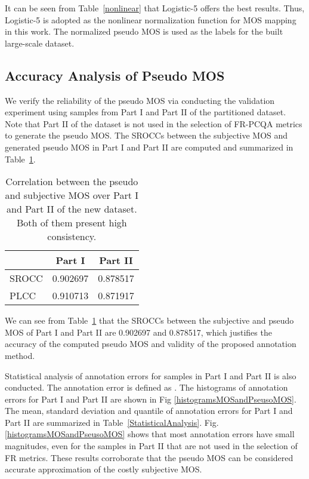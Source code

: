 \documentclass[acmsmall]{acmart}
\begin{document}
\par It can be seen from Table~\ref{nonlinear} that Logistic-5 offers the best results. Thus, Logistic-5 is adopted as the nonlinear normalization function for MOS mapping in this work. The normalized pseudo MOS is used as the labels for the built large-scale dataset.





\subsection{Accuracy Analysis of Pseudo MOS} \label{sec:accuracyverification}

\par We verify the reliability of the pseudo MOS via conducting the validation experiment using samples from Part I and Part II of the partitioned dataset. Note that Part II of the dataset is not used in the selection of FR-PCQA metrics to generate the pseudo MOS. The SROCCs between the subjective MOS and generated pseudo MOS in Part I and Part II are computed and summarized in Table~\ref{pseudoverification}.

\begin{table}[htbp]
  \centering
  \caption{Correlation between the pseudo and subjective MOS over Part I and Part II of the new dataset. Both of them present high consistency.}
  \begin{footnotesize}
    \begin{tabular}{l|cc}
    \hline
          & Part I & Part II \\
    \hline
    SROCC & 0.902697 & 0.878517 \\
    PLCC  & 0.910713 & 0.871917 \\
    \hline
    \end{tabular}\end{footnotesize}
  \label{pseudoverification}\end{table}

\par We can see from Table~\ref{pseudoverification} that the SROCCs between the subjective and pseudo MOS of Part I and Part II are 0.902697 and 0.878517, which justifies the accuracy of the computed pseudo MOS and validity of the proposed annotation method.

\par Statistical analysis of annotation errors for samples in Part I and Part II is also conducted. The annotation error is defined as . The histograms of annotation errors for Part I and Part II are shown in Fig \ref{histogramsMOSandPseusoMOS}. The mean, standard deviation and  quantile of annotation errors for Part I and Part II are summarized in Table~\ref{StatisticalAnalysis}. Fig. \ref{histogramsMOSandPseusoMOS} shows that most annotation errors have small magnitudes, even for the samples in Part II that are not used in the selection of FR metrics. These results corroborate that the pseudo MOS can be considered accurate approximation of the costly subjective MOS.
\end{document}
